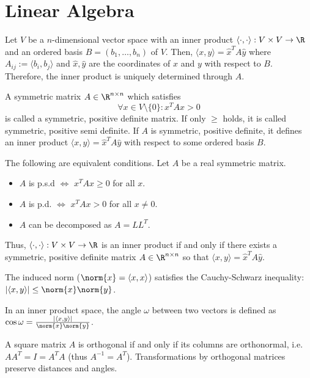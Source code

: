 \section{Linear Algebra}

Let $V$ be a $n$-dimensional vector space
with an inner product $\langle\cdot,\cdot\rangle : V \times V \to \R$
and an ordered basis $B = (b_1, \dotsc, b_n)$ of $V$.
Then, $\langle x, y \rangle = \hat{x}^T A \hat{y}$ where
$A_{ij} := \langle b_i, b_j \rangle$ and $\hat{x}, \hat{y}$ are the coordinates
of $x$ and $y$ with respect to $B$.
Therefore, the inner product is uniquely determined through $A$.

A symmetric matrix $A \in \R^{n \times n}$ which satisfies
\begin{equation*}
    \forall x \in V \setminus \{0\} : x^T A x > 0
\end{equation*}
is called a symmetric, positive definite matrix.
If only $\geq$ holds, it is called symmetric, positive semi definite.
If $A$ is symmetric, positive definite, it defines an inner product $\langle x, y \rangle = \hat{x}^T A \hat{y}$
with respect to some ordered basis $B$.

The following are equivalent conditions.
Let $A$ be a real symmetric matrix.
\begin{itemize}
    \item $A$ is p.s.d $\Longleftrightarrow$ $x^T Ax \geq 0$ for all $x$.
    \item $A$ is p.d. $\Longleftrightarrow$ $x^T Ax > 0$ for all $x \neq 0$.
    \item $A$ can be decomposed as $A = L L^T$.
\end{itemize}

Thus, $\langle\cdot,\cdot\rangle : V \times V \to \R$ is an inner product if and only if
there exists a symmetric, positive definite matrix $A \in \R^{n \times n}$ so that
$\langle x, y \rangle = \hat{x}^T A \hat{y}$.

The induced norm ($\norm{x} = \langle x, x \rangle$) satisfies the Cauchy-Schwarz inequality:
$| \langle x, y \rangle | \leq \norm{x} \norm{y}$.

In an inner product space, the angle $\omega$ between two vectors is defined as
$\cos{\omega} = \frac{| \langle x, y \rangle |}{\norm{x} \norm{y}}$.

A square matrix $A$ is orthogonal if and only if its columns are orthonormal, i.e.
$A A^T = I = A^T A$ (thus $A^{-1} = A^T$).
Transformations by orthogonal matrices preserve distances and angles.

